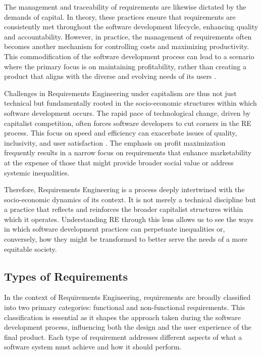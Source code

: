 \begin{refsection}
The management and traceability of requirements are likewise dictated by the demands of capital. In theory, these practices ensure that requirements are consistently met throughout the software development lifecycle, enhancing quality and accountability. However, in practice, the management of requirements often becomes another mechanism for controlling costs and maximizing productivity. This commodification of the software development process can lead to a scenario where the primary focus is on maintaining profitability, rather than creating a product that aligns with the diverse and evolving needs of its users \cite[pp.~101-120]{mackenzie1999social}.

Challenges in Requirements Engineering under capitalism are thus not just technical but fundamentally rooted in the socio-economic structures within which software development occurs. The rapid pace of technological change, driven by capitalist competition, often forces software developers to cut corners in the RE process. This focus on speed and efficiency can exacerbate issues of quality, inclusivity, and user satisfaction \cite[pp.~180-200]{schumpeter2015capitalism}. The emphasis on profit maximization frequently results in a narrow focus on requirements that enhance marketability at the expense of those that might provide broader social value or address systemic inequalities.

Therefore, Requirements Engineering is a process deeply intertwined with the socio-economic dynamics of its context. It is not merely a technical discipline but a practice that reflects and reinforces the broader capitalist structures within which it operates. Understanding RE through this lens allows us to see the ways in which software development practices can perpetuate inequalities or, conversely, how they might be transformed to better serve the needs of a more equitable society.

\subsection{Types of Requirements}

In the context of Requirements Engineering, requirements are broadly classified into two primary categories: functional and non-functional requirements. This classification is essential as it shapes the approach taken during the software development process, influencing both the design and the user experience of the final product. Each type of requirement addresses different aspects of what a software system must achieve and how it should perform.


\end{refsection}
